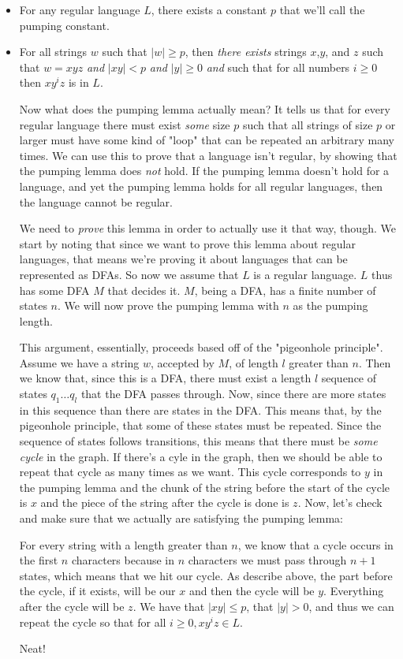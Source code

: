 \documentclass[11pt]{article}
\begin{document}
\begin{itemize}
\item For any regular language $L$, there exists a constant $p$ that we'll call the pumping constant.
\item For all strings $w$ such that $|w| \geq p$, then \emph{there exists} strings $x$,$y$, and $z$ such that $w = xyz$ \emph{and} $|xy| < p$ \emph{and} $|y| \geq 0$ \emph{and} such that for all numbers $i \geq 0$ then $xy^iz$ is in $L$.

Now what does the pumping lemma actually mean? It tells us that for every regular language there must exist \emph{some} size $p$ such that all strings of size $p$ or larger must have some kind of "loop" that can be repeated an arbitrary many times. We can use this to prove that a language isn't regular, by showing that the pumping lemma does \emph{not} hold. If the pumping lemma doesn't hold for a language, and yet the pumping lemma holds for all regular languages, then the language cannot be regular.

We need to \emph{prove} this lemma in order to actually use it that way, though. We start by noting that since we want to prove this lemma about regular languages, that means we're proving it about languages that can be represented as DFAs. So now we assume that $L$ is a regular language. $L$ thus has some DFA $M$ that decides it. $M$, being a DFA, has a finite number of states $n$. We will now prove the pumping lemma with $n$ as the pumping length. 

This argument, essentially, proceeds based off of the "pigeonhole principle". Assume we have a string $w$, accepted by $M$, of length $l$ greater than $n$. Then we know that, since this is a DFA, there must exist a length $l$ sequence of states $q_1 \ldots q_l$ that the DFA passes through. Now, since there are more states in this sequence than there are states in the DFA. This means that, by the pigeonhole principle, that some of these states must be repeated. Since the sequence of states follows transitions, this means that there must be \emph{some cycle} in the graph. If there's a cyle in the graph, then we should be able to repeat that cycle as many times as we want. This cycle corresponds to $y$ in the pumping lemma and the chunk of the string before the start of the cycle is $x$ and the piece of the string after the cycle is done is $z$. Now, let's check and make sure that we actually are satisfying the pumping lemma:

For every string with a length greater than $n$, we know that a cycle occurs in the first $n$ characters because in $n$ characters we must pass through $n+1$ states, which means that we hit our cycle. As describe above, the part before the cycle, if it exists, will be our $x$ and then the cycle will be $y$. Everything after the cycle will be $z$. We have that $|xy| \leq p$, that $|y| > 0$, and thus we can repeat the cycle so that for all $i \geq 0, xy^iz \in L$.

Neat!
\end{itemize}
\end{document}
